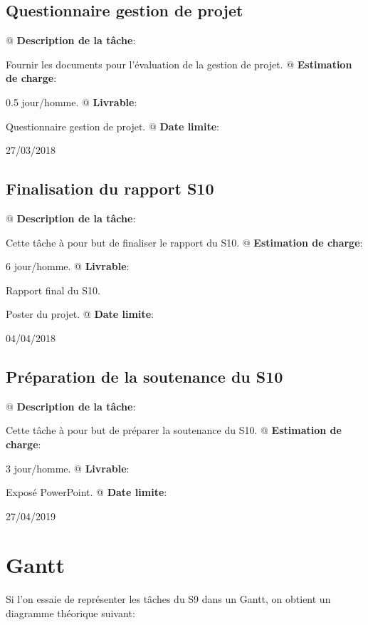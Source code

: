 \documentclass[final]{polytech/polytech}
\begin{document}
		\subsection{Questionnaire gestion de projet}
			\begin{easylist}
				@ \textbf{Description de la tâche}:
				
				Fournir les documents pour l'évaluation de la gestion de projet.			
				@ \textbf{Estimation de charge}:
				
				0.5 jour/homme.
				@ \textbf{Livrable}:
				
				Questionnaire gestion de projet.
				@ \textbf{Date limite}:
				
				27/03/2018
			\end{easylist}
			
		\subsection{Finalisation du rapport S10}
			\begin{easylist}
				@ \textbf{Description de la tâche}:
				
				Cette tâche à pour but de finaliser le rapport du S10.			
				@ \textbf{Estimation de charge}:
				
				6 jour/homme.
				@ \textbf{Livrable}:
				
				Rapport final du S10.
				
				Poster du projet.
				@ \textbf{Date limite}:
				
				04/04/2018
			\end{easylist}
			
		\subsection{Préparation de la soutenance du S10}
			\begin{easylist}
				@ \textbf{Description de la tâche}:
				
				Cette tâche à pour but de préparer la soutenance du S10.
				@ \textbf{Estimation de charge}:
				
				3 jour/homme.
				@ \textbf{Livrable}:
				
				Exposé PowerPoint.
				@ \textbf{Date limite}:
				
				27/04/2019
			\end{easylist}
	\section{Gantt}
		Si l'on essaie de représenter les tâches du S9 dans un Gantt, on obtient un diagramme théorique suivant:
\end{document}
